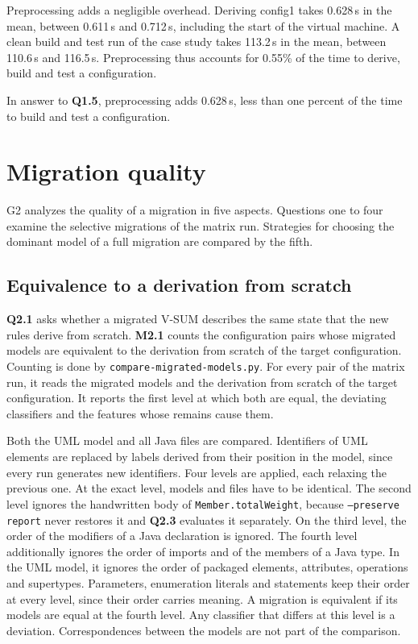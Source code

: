Preprocessing adds a negligible overhead.
Deriving config1 takes 0.628\,s in the mean, between 0.611\,s and 0.712\,s, including the start of the virtual machine.
A clean build and test run of the case study takes 113.2\,s in the mean, between 110.6\,s and 116.5\,s.
Preprocessing thus accounts for 0.55\% of the time to derive, build and test a configuration.

In answer to \textbf{Q1.5}, preprocessing adds 0.628\,s, less than one percent of the time to build and test a configuration.

\section{Migration quality}
\label{sec:Evaluation:MigrationQuality}

G2 analyzes the quality of a migration in five aspects.
Questions one to four examine the selective migrations of the matrix run.
Strategies for choosing the dominant model of a full migration are compared by the fifth.

\subsection{Equivalence to a derivation from scratch}
\label{sec:Evaluation:MigrationQuality:EquivalenceToADerivationFromScratch}

\textbf{Q2.1} asks whether a migrated V-SUM describes the same state that the new rules derive from scratch.
\textbf{M2.1} counts the configuration pairs whose migrated models are equivalent to the derivation from scratch of the target configuration.
Counting is done by \texttt{compare-migrated-models.py}.
For every pair of the matrix run, it reads the migrated models and the derivation from scratch of the target configuration.
It reports the first level at which both are equal, the deviating classifiers and the features whose remains cause them.

Both the UML model and all Java files are compared.
Identifiers of UML elements are replaced by labels derived from their position in the model, since every run generates new identifiers.
Four levels are applied, each relaxing the previous one.
At the exact level, models and files have to be identical.
The second level ignores the handwritten body of \texttt{Member.totalWeight}, because \texttt{--preserve report} never restores it and \textbf{Q2.3} evaluates it separately.
On the third level, the order of the modifiers of a Java declaration is ignored.
The fourth level additionally ignores the order of imports and of the members of a Java type.
In the UML model, it ignores the order of packaged elements, attributes, operations and supertypes.
Parameters, enumeration literals and statements keep their order at every level, since their order carries meaning.
A migration is equivalent if its models are equal at the fourth level.
Any classifier that differs at this level is a deviation.
Correspondences between the models are not part of the comparison.

